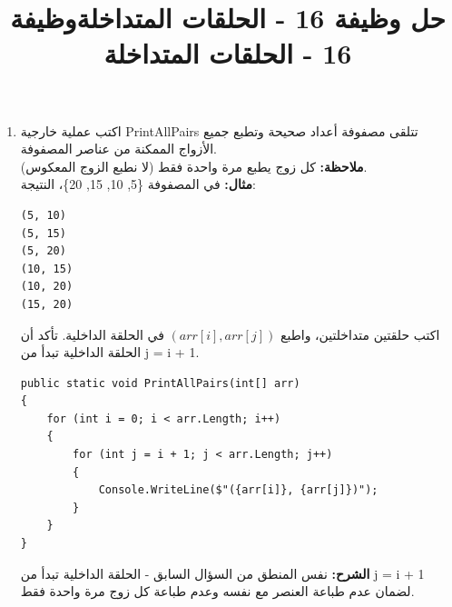 \documentclass[14pt]{extarticle}
\title{حل وظيفة 16 - الحلقات المتداخلة}
\title{وظيفة 16 - الحلقات المتداخلة}
\begin{document}
\maketitle
\thispagestyle{fancy}

\begin{enumerate}[itemsep=2em]
    \item
    اكتب عملية خارجية \textenglish{PrintAllPairs} تتلقى مصفوفة أعداد صحيحة وتطبع جميع الأزواج الممكنة من عناصر المصفوفة.\\
    \textbf{ملاحظة:} كل زوج يطبع مرة واحدة فقط (لا نطبع الزوج المعكوس).\\
    \textbf{مثال:} في المصفوفة \textenglish{\{5, 10, 15, 20\}}، النتيجة:
    \begin{english}
        \begin{boxCode}
        \begin{verbatim}
(5, 10)
(5, 15)
(5, 20)
(10, 15)
(10, 20)
(15, 20)
\end{verbatim}
\end{boxCode}
\end{english}

    \begin{boxHint}
        اكتب حلقتين متداخلتين، واطبع $(arr[i], arr[j])$ في الحلقة الداخلية. تأكد أن الحلقة الداخلية تبدأ من \textenglish{j = i + 1}.
    \end{boxHint}
    \ifwithsols
    \begin{boxSolution}
    \begin{english}
    \begin{verbatim}
public static void PrintAllPairs(int[] arr)
{
    for (int i = 0; i < arr.Length; i++)
    {
        for (int j = i + 1; j < arr.Length; j++)
        {
            Console.WriteLine($"({arr[i]}, {arr[j]})");
        }
    }
}
    \end{verbatim}
    \end{english}
    \textbf{الشرح:} نفس المنطق من السؤال السابق - الحلقة الداخلية تبدأ من \textenglish{j = i + 1} لضمان عدم طباعة العنصر مع نفسه وعدم طباعة كل زوج مرة واحدة فقط.
    \end{boxSolution}
    \clearpage
    \fi


\end{enumerate}
\end{document}
